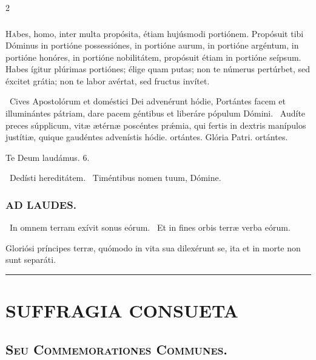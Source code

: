 \documentclass[9pt,twoside]{extarticle}
\begin{document}
\begin{multicols}{2}
{{{\subsubsection*{\center {}}
\lettrine{H}abes, homo, inter multa propósita, étiam hujúsmodi portiónem. Propósuit tibi Dóminus in portióne possessiónes, in portióne aurum, in portióne argéntum, in portióne honóres, in portióne nobilitátem, propósuit étiam in portióne seípsum. Habes ígitur plúrimas portiónes; élige quam putas; non te númerus pertúrbet, sed éxcitet grátia; non te labor avértat, sed fructus invítet.

\begin{tightlist}{}
\item {}~Cives Apostolórum et doméstici Dei advenérunt hódie, \textred{*} Portántes facem et illuminántes pátriam, dare pacem géntibus et liberáre pópulum Dómini. ~Audíte preces súpplicum, vitæ ætérnæ poscéntes prǽmia, qui fertis in dextris manípulos justítiæ, quique gaudéntes advenístis hódie. ortántes. Glória Patri. ortántes.
\item Te Deum laudámus. 6.
\item {}~Dedísti hereditátem. ~Timéntibus nomen tuum, Dómine.
\end{tightlist}

\subsubsection*{\center \textsc{AD LAUDES.}}
\begin{tightlist}{}
\item {}~In omnem terram exívit sonus eórum. ~Et in fines orbis terræ verba eórum.
\item {} Gloriósi príncipes terræ, quómodo in vita sua dilexérunt se, ita et in morte non sunt separáti.
\end{tightlist}

\begin{center}\textcolor{red}{\rule{\linewidth}{0.5pt}} \end{center}
\clearpage
\section*{\center \textsc{SUFFRAGIA CONSUETA}}
\subsection*{\center \textsc{Seu Commemorationes Communes.}}

}}}
\end{multicols}
\end{document}
